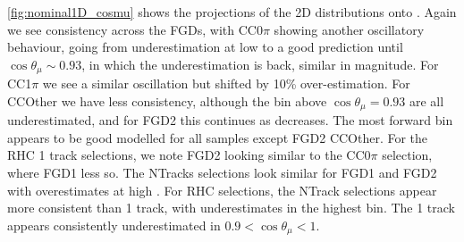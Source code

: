 \autoref{fig:nominal1D_cosmu} shows the projections of the 2D distributions onto \cosmu. Again we see consistency across the FGDs, with CC0$\pi$ showing another oscillatory behaviour, going from underestimation at low \cosmu to a good prediction until $\cos \theta_\mu \sim 0.93$, in which the underestimation is back, similar in magnitude. For CC1$\pi$ we see a similar oscillation but shifted by 10\% over-estimation. For \numu CCOther we have less consistency, although the bin above $\cos \theta_\mu = 0.93$ are all underestimated, and for FGD2 this continues as \cosmu decreases. The most forward bin appears to be good modelled for all \numu samples except FGD2 CCOther. For the RHC 1 track selections, we note FGD2 looking similar to the CC0$\pi$ selection, where FGD1 less so. The NTracks selections look similar for FGD1 and FGD2 with overestimates at high \cosmu. For RHC \numu selections, the NTrack selections appear more consistent than 1 track, with underestimates in the highest \cosmu bin. The 1 track appears consistently underestimated in $0.9 < \cos\theta_\mu < 1$.

